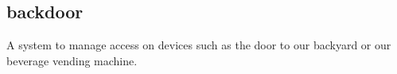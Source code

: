 \documentclass[]{resume}
\begin{document}
\begin{timeline}
\subsection{backdoor}
A system to manage access on devices such as the door to our backyard or our beverage vending machine.
\sectionsep

\end{timeline}
\end{document}
